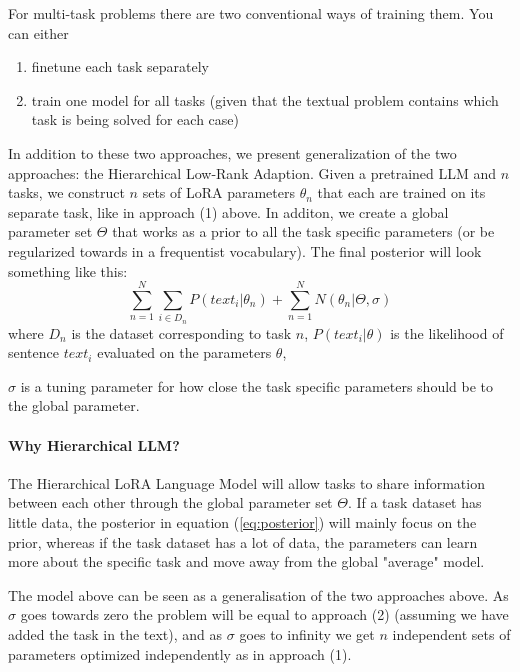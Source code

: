 \documentclass{article}
\begin{document}
For multi-task problems there are two conventional ways of training them. You can either 
\begin{enumerate}
    \item finetune each task separately
    \item train one model for all tasks (given that the textual problem contains which task is being solved for each case)
\end{enumerate}

In addition to these two approaches, we present generalization of the two approaches: the Hierarchical Low-Rank Adaption.
Given a pretrained LLM and $n$ tasks, we construct $n$ sets of LoRA parameters $\theta_n$ that each are trained on its separate task, like in approach (1) above. In additon, we create a global parameter set $\Theta$ that works as a prior to all the task specific parameters (or be regularized towards in a frequentist vocabulary).
The final posterior will look something like this:
%
\begin{equation} \label{eq:posterior}
    \sum_{n=1}^N  \sum_{i \in D_n} P(text_i | \theta_n) + \sum_{n=1}^N N(\theta_n | \Theta, \sigma)
\end{equation}
%
where
$D_n$ is the dataset corresponding to task $n$,
$P(text_i | \theta)$ is the likelihood of sentence $text_i$ evaluated on the parameters $\theta$,

$\sigma$ is a tuning parameter for how close the task specific parameters should be to the global parameter.

\paragraph{Why Hierarchical LLM?}
The Hierarchical LoRA Language Model will allow tasks to share information between each other through the global parameter set $\Theta$.
If a task dataset has little data, the posterior  in equation (\ref{eq:posterior}) will mainly focus on the prior, whereas if the task dataset has a lot of data, the parameters can learn more about the specific task and move away from the global "average" model.

The model above can be seen as a generalisation of the two approaches above.
As $\sigma$ goes towards zero the problem will be equal to approach (2) (assuming we have added the task in the text), 
and as $\sigma$ goes to infinity we get $n$ independent sets of parameters optimized independently as in approach (1).
\end{document}
